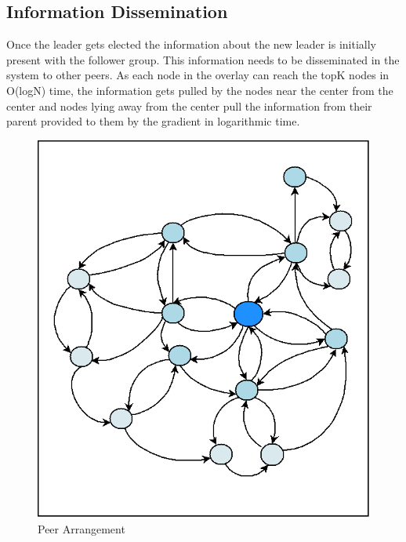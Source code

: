 \documentclass[a4paper,11pt]{kth-mag}
\begin{document}
\subsection{Information Dissemination}

Once the leader gets elected the information about the new leader is initially present with the follower group. This information needs to be disseminated in the system to other peers. As each node in the overlay can reach the topK nodes in O(logN) time, the information gets pulled by the nodes near the center from the center and nodes lying away from the center pull the information from their parent provided to them by the gradient in logarithmic time.

\begin{figure}[h]
	\includegraphics[scale=0.5]{p2p}
	\centering
	\caption{Peer Arrangement}
	\label{fig:p-arrange}
\end{figure}
\end{document}
